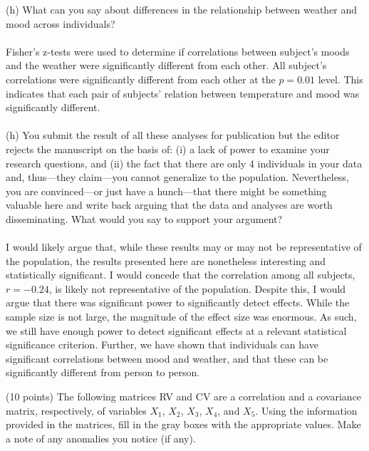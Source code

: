 \documentclass[onecolumn,10pt]{jhwhw}
\begin{document}
(h) What can you say about differences in the relationship between weather and mood across individuals?\\
\\
Fisher's z-tests were used to determine if correlations between subject's moods and the weather were significantly different from each other. All subject's correlations were significantly different from each other at the $p=0.01$ level. This indicates that each pair of subjects' relation between temperature and mood was significantly different.\\
\\
(h) You submit the result of all these analyses for publication but the editor rejects the manuscript on the basis of: (i) a lack of power to examine your research questions, and (ii) the fact that there are only 4 individuals in your data and, thus---they claim---you cannot generalize to the population. Nevertheless, you are convinced---or just have a hunch---that there might be something valuable here and write back arguing that the data and analyses are worth disseminating. What would you say to support your argument?\\
\\
I would likely argue that, while these results may or may not be representative of the population, the results presented here are nonetheless interesting and statistically significant. I would concede that the correlation among all subjects, $r=-0.24$, is likely not representative of the population. Despite this, I would argue that there was significant power to significantly detect effects. While the sample size is not large, the magnitude of the effect size was enormous. As such, we still have enough power to detect significant effects at a relevant statistical significance criterion. Further, we have shown that individuals can have significant correlations between mood and weather, and that these can be significantly different from person to person.

\clearpage
\problem{}
(10 points) The following matrices RV and CV are a correlation and a covariance matrix, respectively, of variables $X_1$, $X_2$, $X_3$, $X_4$, and $X_5$. Using the information provided in the matrices, fill in the gray boxes with the appropriate values. Make a note of any anomalies you notice (if any).
\end{document}
